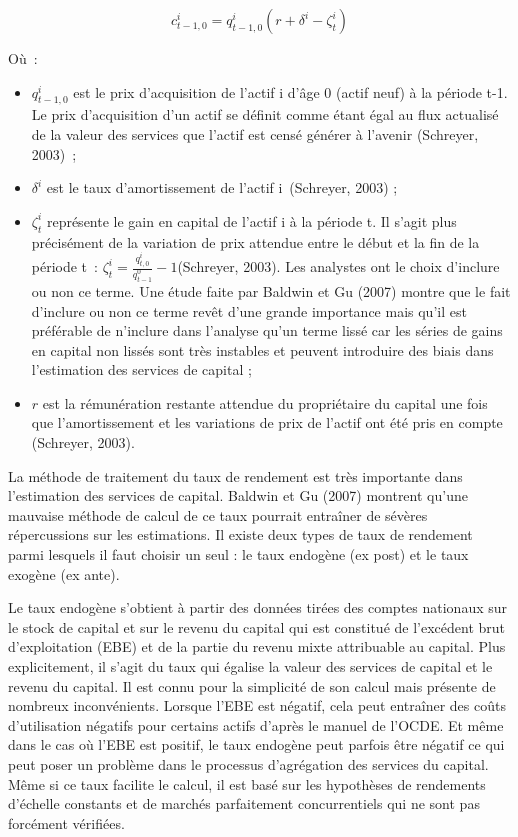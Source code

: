 \documentclass[12pt,a4paper,oneside]{report}
\begin{document}
\[
{c}_{t-1,0}^{i}={q}_{t-1, 0}^{i}(r+{\delta }^{i}-{\zeta }_{t}^{i})
\]

Où~:

\begin{itemize}

\item \({q}_{t-1, 0}^{i}\) est le prix d’acquisition de l’actif i d’âge \(0\) (actif neuf) à la période t-1.
Le prix d’acquisition d’un actif se définit comme étant égal au flux actualisé de la valeur des services que
l’actif est censé générer à l’avenir (Schreyer, 2003)~;

\item \({\delta }^{i}\) est le taux d’amortissement de l’actif i~(Schreyer, 2003) ;

\item \({\zeta }_{t}^{i}\) représente le gain en capital de l’actif i à la période t. Il s’agit plus
précisément de la variation de prix attendue entre le début et la fin de la période t~: \({\zeta
}_{t}^{i}=\frac{{q}_{t,0}^{i}}{{q}_{t-1}^{0}}-1 \)(Schreyer, 2003). Les analystes ont le choix d’inclure ou
non ce terme. Une étude faite par Baldwin et Gu (2007) montre que le fait d’inclure ou non ce terme revêt
d’une grande importance mais qu’il est préférable de n’inclure dans l’analyse qu’un terme lissé car les séries
de gains en capital non lissés sont très instables et peuvent introduire des biais dans l’estimation des
services de capital ;

\item \(r\) est la rémunération restante attendue du propriétaire du capital une fois que l’amortissement et
les variations de prix de l’actif ont été pris en compte (Schreyer, 2003).

\end{itemize}

La méthode de traitement du taux de rendement est très importante dans l’estimation des services de capital.
Baldwin et Gu (2007) montrent qu’une mauvaise méthode de calcul de ce taux pourrait entraîner de sévères
répercussions sur les estimations. Il existe deux types de taux de rendement parmi lesquels il faut choisir un
seul : le taux endogène (ex post) et le taux exogène (ex ante).

Le taux endogène s’obtient à partir des données tirées des comptes nationaux sur le stock de capital et sur le
revenu du capital qui est constitué de l’excédent brut d’exploitation (EBE) et de la partie du revenu mixte
attribuable au capital. Plus explicitement, il s’agit du taux qui égalise la valeur des services de capital et
le revenu du capital. Il est connu pour la simplicité de son calcul mais présente de nombreux inconvénients.
Lorsque l’EBE est négatif, cela peut entraîner des coûts d’utilisation négatifs pour certains actifs d’après
le manuel de l’OCDE. Et même dans le cas où l’EBE est positif, le taux endogène peut parfois être négatif ce
qui peut poser un problème dans le processus d’agrégation des services du capital. Même si ce taux facilite le
calcul, il est basé sur les hypothèses de rendements d’échelle constants et de marchés parfaitement
concurrentiels qui ne sont pas forcément vérifiées.
\end{document}
